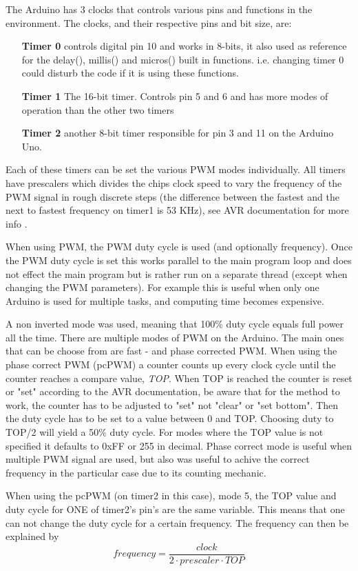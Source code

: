 \documentclass[a4paper,11pt]{kth-mag}
\begin{document}
The Arduino has 3 clocks that controls various pins and functions in the environment. The clocks, and their respective pins and bit size, are:
\begin{itemize}
\item[\textbf{Timer 0}]
controls digital pin 10 and
works in 8-bits, it also used as reference for the delay(), millis() and micros() built in functions. i.e. changing timer 0 could disturb the code if it is using these functions. 
\item[\textbf{Timer 1}]
The 16-bit timer. Controls pin 5 and 6 and has more modes of operation than the other two timers
\item[\textbf{Timer 2}]
another 8-bit timer responsible for pin 3 and 11 on the 
Arduino Uno.
\end{itemize}
Each of these timers can be set the various PWM modes individually. All timers have prescalers which divides the chips clock speed to vary the frequency of the PWM signal in rough discrete steps (the difference between the fastest and the next to fastest frequency on timer1 is 53 KHz), see AVR documentation for more info \cite{AVR}. 

When using PWM, the PWM duty cycle is used (and optionally frequency). Once the PWM duty cycle is set this works parallel to the main program loop and does not effect the main program but is rather run on a separate thread (except when changing the PWM parameters). For example this is useful when only one Arduino is used for multiple tasks, and computing time becomes expensive. 

A non inverted mode was used, 
meaning that 100\% duty cycle equals full power all the time. There are multiple modes of PWM on the Arduino. The main ones that can be choose from are fast - and phase corrected PWM. 
When using the phase correct PWM (pcPWM) a counter counts up every clock cycle until the counter reaches a compare value, \textit{TOP}. When TOP is reached the counter is reset or "set" according to the AVR 
documentation, be aware that for the method to work, the counter has to be adjusted to "set" not "clear" or "set bottom". Then the duty cycle has to be set to a value between 0 and TOP. Choosing duty to TOP/2 will yield a 50\% duty cycle. For modes where the TOP value is not specified it defaults to 0xFF or 255 in decimal.
Phase correct mode is useful when multiple PWM signal are used, but also was useful to achive the correct frequency in the particular case due to its counting mechanic.

When using the pcPWM (on timer2 in this case), mode 5, the TOP value and duty cycle for ONE of timer2's pin's are the same variable. This means that one can not change the duty 
cycle for a certain frequency. The frequency can then be explained by
\begin{equation} \label{eq: clock freq}
frequency = \frac{clock}{2 \cdot prescaler \cdot TOP}
\end{equation}
\end{document}
